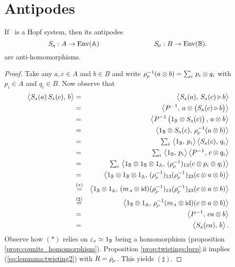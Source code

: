 \section{Antipodes}


\begin{prop_sec}  \label{prop:antipodes:anti_homomorphisms}
If\/ \pairAB\ is a Hopf system, then its antipodes
$$ S_{\scriptscriptstyle \! A} : A \rightarrow \mbox{\rm Env}(\mathbb{A})     \hspace{8em}    S_{\scriptscriptstyle \! B} : B \rightarrow \mbox{\rm Env}(\mathbb{B}). $$
are anti-homomorphisms.
\end{prop_sec}

\begin{proof}
Take any $a,c\in A$ and $b\in B$ and write
$\rho_{_{\!P}}^{-1}(a \otimes b) = \sum_i \, p_i \otimes q_i$ with $p_i \in A$ and $q_i \in B$.
Now observe that
\begin{eqnarray*}
      \pairM{\SA(a)\, \SA(c)}{b}
&=&
      \pairM{\SA(a)}{\SA(c) \lact b}
\\&=&
      \pairM{P^{-1}}{a \tens \left(\SA(c) \lact b\vertM\right)}
\\&=&
      \pairM{P^{-1} \left(1_\BB \tens \SA(c) \vertM\right)}{a \tens b}
\\&=&
      \pairM{1_\BB \tens \SA(c)}{\rp^{-1}(a \tens b)}
\\&=&
      \textstyle \sum_i \, \pairM{1_\BB}{p_i} \pairM{\SA(c)}{q_i}
\\&=&
      \textstyle \sum_i \, \pairM{1_\BB}{p_i} \pairM{P^{-1}}{c \tens q_i}
\\&=&
      \textstyle \sum_i \,
      \pairM{1_\BB \tens 1_\BB \tens 1_\Aa}{
             (\rp^{-1})_{13} (c \tens p_i \tens  q_i)}
\\&=&
      \pairM{1_\BB \tens 1_\BB \tens 1_\Aa}{
             (\rp^{-1})_{13} (\rp^{-1})_{23} (c \tens a \tens b)}
\\&\stackrel{(*)}{=}&
      \pairM{1_\BB \tens 1_\Aa}{
             (\mult{A} \tens \id) (\rp^{-1})_{13} (\rp^{-1})_{23} (c \tens a \tens b)}
\\&\stackrel{(\sharp)}{=}&
      \pairM{1_\BB \tens 1_\Aa}{ \rp^{-1} (\mult{A} \tens \id) (c \tens a \tens b)}
\\&=&
      \pairM{P^{-1}}{ca \tens b}
\\&=&
      \pairM{\SA(ca)}{b}.
\end{eqnarray*}
Observe how $(*)$ relies on $\varepsilon_{\scriptscriptstyle \! A} \simeq 1_{\mathbb{B}}$ being a homomorphism
(proposition \ref{prop:counits_homomorphism}).
Proposition \ref{prop:twistings:lprp}.ii implies (\ref{eq:lemmma:twisting2}) with $R=\rho_{_{\!P}}$.
This yields $(\sharp)$.
\end{proof}





